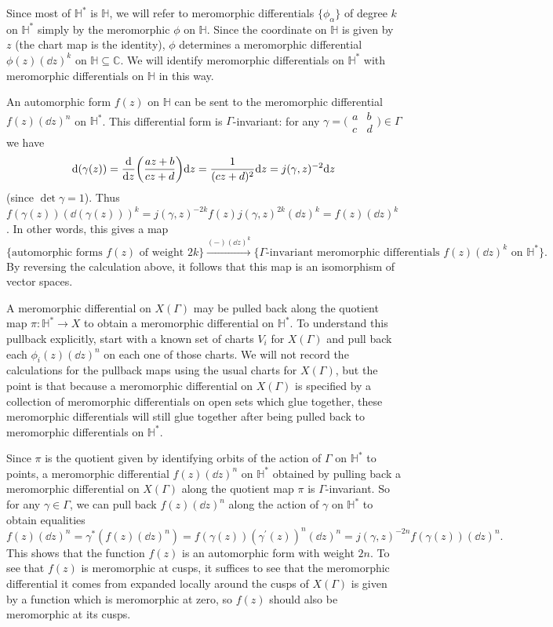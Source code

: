 \documentclass[11pt,leqno]{article}
\theoremstyle{plain}
\theoremstyle{definition}
\numberwithin{equation}{section}
\numberwithin{lem}{section}
\begin{document}
Since most of $\mathbb H^\ast$ is $\mathbb H$, we will refer to meromorphic differentials $\{\phi_\alpha\}$ of degree $k$ on $\mathbb H^\ast$ simply by the meromorphic $\phi$ on $\mathbb H$. Since the coordinate on $\mathbb H$ is given by $z$ (the chart map is the identity), $\phi$ determines a meromorphic differential $\phi(z)(\dd z)^k$ on $\mathbb H\subseteq \mathbb C$. We will identify meromorphic differentials on $\mathbb H^\ast$ with meromorphic differentials on $\mathbb H$ in this way.

An automorphic form $f(z)$ on $\mathbb H$ can be sent to the meromorphic differential $f(z)(\dd z)^n$ on $\mathbb H^\ast$. This differential form is $\Gamma$-invariant: for any $\gamma = \bigl(\!\begin{smallmatrix}
    a & b \\ c & d
\end{smallmatrix}\!\bigr)\in\Gamma$ we have 
\[\dd(\gamma(z)) = \dv{z}\biggl(\frac{az+b}{cz+d}\biggr)\dd z  = \frac{1}{(cz+d)^2}\dd z = j(\gamma,z)^{-2}\dd z\]
(since $\det\gamma = 1$). Thus $f(\gamma(z))(\dd(\gamma(z)))^k = j(\gamma,z)^{-2k}f(z)j(\gamma,z)^{2k}(\dd z)^k = f(z)(\dd z)^k$. In other words, this gives a map 
\[\{\text{automorphic forms }f(z)\text{ of weight $2k$}\}\xrightarrow{(-)(\dd z)^k} \{\Gamma\text{-invariant meromorphic differentials }f(z)(\dd z)^k\text{ on }\mathbb H^\ast\}.\]
By reversing the calculation above, it follows that this map is an isomorphism of vector spaces.

A meromorphic differential on $X(\Gamma)$ may be pulled back along the quotient map $\pi\colon \mathbb H^\ast \to X$ to obtain a meromorphic differential on $\mathbb H^\ast$. To understand this pullback explicitly, start with a known set of charts $V_i$ for $X(\Gamma)$ and pull back each $\phi_i(z)(\dd z)^n$ on each one of those charts. We will not record the calculations for the pullback maps using the usual charts for $X(\Gamma)$, but the point is that because a meromorphic differential on $X(\Gamma)$ is specified by a collection of meromorphic differentials on open sets which glue together, these meromorphic differentials will still glue together after being pulled back to meromorphic differentials on $\mathbb H^\ast$.

Since $\pi$ is the quotient given by identifying orbits of the action of $\Gamma$ on $\mathbb H^\ast$ to points, a meromorphic differential $f(z)(\dd z)^n$ on $\mathbb H^\ast$ obtained by pulling back a meromorphic differential on $X(\Gamma)$ along the quotient map $\pi$ is $\Gamma$-invariant. So for any $\gamma\in \Gamma$, we can pull back $f(z)(\dd z)^n$ along the action of $\gamma$ on $\mathbb H^\ast$ to obtain equalities 
\[f(z)(\dd z)^n = \gamma^\ast(f(z)(\dd z)^n) = f(\gamma(z))(\gamma^\prime(z))^n(\dd z)^n = j(\gamma, z)^{-2n}f(\gamma(z))(\dd z)^n.\]
This shows that the function $f(z)$ is an automorphic form with weight $2n$. To see that $f(z)$ is meromorphic at cusps, it suffices to see that the meromorphic differential it comes from expanded locally around the cusps of $X(\Gamma)$ is given by a function which is meromorphic at zero, so $f(z)$ should also be meromorphic at its cusps.
\end{document}
